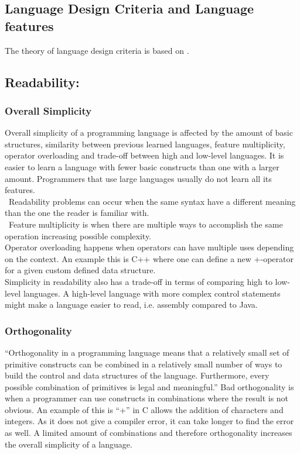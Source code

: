 \subsection{Language Design Criteria and Language features}
The theory of language design criteria is based on \cite{conceptsOfProgrammingLanguages}.
\label{language-design-criteria}
\label{design-criteria-theory}
\subsection*{Readability:}
\subsubsection*{Overall Simplicity}
Overall simplicity of a programming language is affected by the amount of basic structures, similarity between previous learned languages, feature multiplicity, operator overloading and trade-off between high and low-level languages.
It is easier to learn a language with fewer basic constructs than one with a larger amount. Programmers that use large languages usually do not learn all its features. \\\
Readability problems can occur when the same syntax have a different meaning than the one the reader is familiar with. \\\
Feature multiplicity is when there are multiple ways to accomplish the same operation increasing possible complexity. \\
Operator overloading happens when operators can have multiple uses depending on the context. An example this is C++ where one can define a new +-operator for a given custom defined data structure. \\
Simplicity in readability also has a trade-off in terms of comparing high to low-level languages. A high-level language with more complex control statements might make a language easier to read, i.e. assembly compared to Java.

\subsubsection*{Orthogonality}
“Orthogonality in a programming language means that a relatively small set
of primitive constructs can be combined in a relatively small number of ways
to build the control and data structures of the language. Furthermore, every possible combination of primitives is legal and meaningful.”
Bad orthogonality is when a programmer can use constructs in combinations where the result is not obvious. An example of this is “+” in C allows the addition of characters and integers. As it does not give a compiler error, it can take longer to find the error as well.
A limited amount of combinations and therefore orthogonality increases the overall simplicity of a language.

